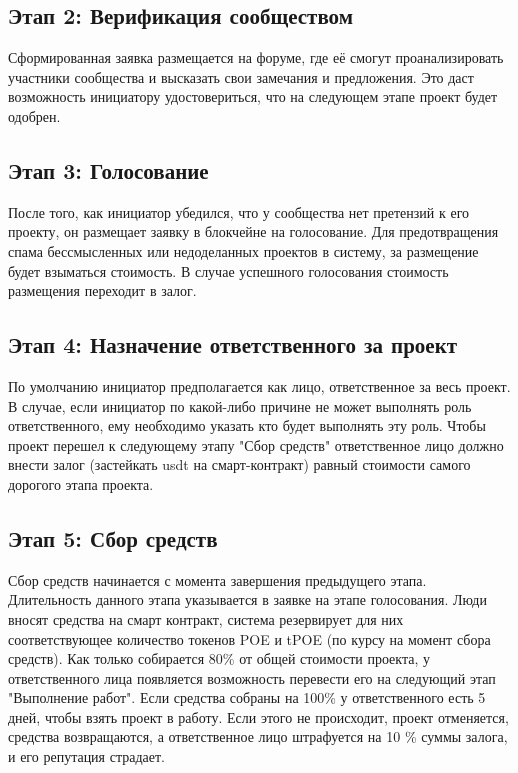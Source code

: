 \documentclass[a4paper,12pt]{report}
\begin{document}
\subsection{Этап 2: Верификация сообществом}
	Сформированная заявка размещается на форуме, где её смогут проанализировать участники сообщества и высказать свои замечания и предложения. Это даст возможность инициатору удостовериться, что на следующем этапе проект будет одобрен.

\subsection{Этап 3: Голосование}
	После того, как инициатор убедился, что у сообщества нет претензий к его проекту, он размещает заявку в блокчейне на голосование. Для предотвращения  спама бессмысленных или недоделанных проектов в систему, за размещение будет взыматься стоимость. В случае успешного голосования стоимость размещения переходит в залог.

\subsection{Этап 4: Назначение ответственного за проект}
	По умолчанию инициатор предполагается как лицо, ответственное за весь проект. В случае, если инициатор по какой-либо причине не может выполнять роль ответственного, ему необходимо указать кто будет выполнять эту роль. Чтобы проект перешел к следующему этапу "Сбор средств" ответственное лицо должно внести залог (застейкать usdt на смарт-контракт) равный стоимости самого дорогого этапа проекта.

\subsection{Этап 5: Сбор средств}
	Сбор средств начинается с момента завершения предыдущего этапа. Длительность данного этапа указывается в заявке на этапе голосования. Люди вносят средства на смарт контракт, система резервирует для них соответствующее количество токенов POE и tPOE (по курсу на момент сбора средств). Как только собирается 80\% от общей стоимости проекта, у ответственного лица появляется возможность перевести его на следующий этап "Выполнение работ". Если средства собраны на 100\% у ответственного есть 5 дней, чтобы взять проект в работу. Если этого не происходит, проект отменяется, средства возвращаются, а ответственное лицо штрафуется на 10 \% суммы залога, и его репутация страдает. 
\end{document}
